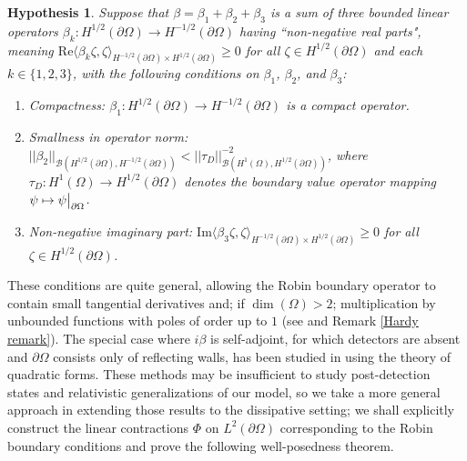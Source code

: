 \documentclass{article}
\numberwithin{equation}{section}
\newtheorem{hypothesis}{Hypothesis}
\begin{document}
\begin{hypothesis}\label{Robin Operator Conditions}
    Suppose that $\beta=\beta_1+\beta_2+\beta_3$ is a sum of three bounded linear operators $\beta_k:H^{1/2}(\partial \Omega)\to H^{-1/2}(\partial \Omega)$ having ``non-negative real parts", meaning \em $\text{Re}\langle \beta_k \zeta,\zeta \rangle_{H^{-1/2}(\partial \Omega)\times H^{1/2}(\partial \Omega)}\geq 0$ \em for all $\zeta\in H^{1/2}(\partial \Omega)$ and each $k\in\{1,2,3\}$, with the following conditions on $\beta_1$, $\beta_2$, and $\beta_3$:
    \begin{enumerate}
        \em \item \em Compactness: $\beta_1:H^{1/2}(\partial \Omega)\to H^{-1/2}(\partial \Omega)$ is a compact operator.
        \em \item \em Smallness in operator norm: $||\beta_2
        ||_{\mathcal{B}(H^{1/2}(\partial \Omega),H^{-1/2}(\partial \Omega))}< ||\tau_D||^{-2}_{\mathcal{B}(H^{1}( \Omega),H^{1/2}(\partial \Omega))}$, where $\tau_D:H^1(\Omega)\to H^{1/2}(\partial \Omega)$ denotes the boundary value operator mapping $\psi \mapsto \psi \big{|}_{\partial \Omega}$.
        \em \item \em Non-negative imaginary part: \em $\text{Im}\langle \beta_3 \zeta, \zeta\rangle_{H^{-1/2}(\partial \Omega)\times H^{1/2}(\partial \Omega)}\geq 0$ \em for all $\zeta \in H^{1/2}(\partial \Omega)$. 
    \end{enumerate}
\end{hypothesis}
These conditions are quite general, allowing the Robin boundary operator to contain small tangential derivatives and; if $\dim(\Omega)>2$; multiplication by unbounded functions with poles of order up to $1$ (see \cite{Hardy} and Remark \ref{Hardy remark}). The special case where $i\beta$ is self-adjoint, for which detectors are absent and $\partial \Omega$ consists only of reflecting walls, has been studied in \cite{Gesztesy09} using the theory of quadratic forms. These methods may be insufficient to study post-detection states and relativistic generalizations of our model, so we take a more general approach in extending those results to the dissipative setting; we shall explicitly construct the linear contractions $\Phi$ on $L^2(\partial \Omega)$ corresponding to the Robin boundary conditions and prove the following well-posedness theorem.  
\end{document}
